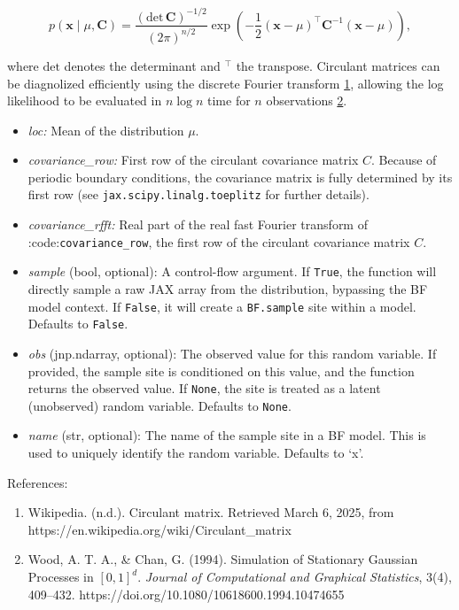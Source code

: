 \documentclass[
  letterpaper,
  DIV=11,
  numbers=noendperiod]{scrartcl}
\begin{document}
\[
    p\left(\mathbf{x}\mid \mu,\mathbf{C}\right) =
    \frac{\left(\mathrm{det}\,\mathbf{C}\right)^{-1/2}}{\left(2\pi\right)^{n / 2}}
    \exp\left(-\frac{1}{2}\left(\mathbf{x}-\mu\right)^\intercal
    \mathbf{C}^{-1}\left(\mathbf{x}-\mu\right)\right),
\]

where \(\mathrm{det}\) denotes the determinant and \(^\intercal\) the
transpose. Circulant matrices can be diagnolized efficiently using the
discrete Fourier transform
\href{https://en.wikipedia.org/wiki/Matrix_normal_distribution}{1},
allowing the log likelihood to be evaluated in \(n \log n\) time for
\(n\) observations
\href{https://statproofbook.github.io/P/matn-pdf.html}{2}.

\begin{itemize}
\item
  \emph{loc:} Mean of the distribution \(\mu\).
\item
  \emph{covariance\_row:} First row of the circulant covariance matrix
  \(C\). Because of periodic boundary conditions, the covariance matrix
  is fully determined by its first row (see
  \texttt{jax.scipy.linalg.toeplitz} for further details).
\item
  \emph{covariance\_rfft:} Real part of the real fast Fourier transform
  of :code:\texttt{covariance\_row}, the first row of the circulant
  covariance matrix \(C\).
\item
  \emph{sample} (bool, optional): A control-flow argument. If
  \texttt{True}, the function will directly sample a raw JAX array from
  the distribution, bypassing the BF model context. If \texttt{False},
  it will create a \texttt{BF.sample} site within a model. Defaults to
  \texttt{False}.
\item
  \emph{obs} (jnp.ndarray, optional): The observed value for this random
  variable. If provided, the sample site is conditioned on this value,
  and the function returns the observed value. If \texttt{None}, the
  site is treated as a latent (unobserved) random variable. Defaults to
  \texttt{None}.
\item
  \emph{name} (str, optional): The name of the sample site in a BF
  model. This is used to uniquely identify the random variable. Defaults
  to `x'.
\end{itemize}

References:

\begin{enumerate}
\def\labelenumi{\arabic{enumi}.}
\item
  Wikipedia. (n.d.). Circulant matrix. Retrieved March 6, 2025, from
  https://en.wikipedia.org/wiki/Circulant\_matrix
\item
  Wood, A. T. A., \& Chan, G. (1994). Simulation of Stationary Gaussian
  Processes in \(\left[0, 1\right]^d\). \emph{Journal of Computational
  and Graphical Statistics}, 3(4), 409--432.
  https://doi.org/10.1080/10618600.1994.10474655
\end{enumerate}
\end{document}
